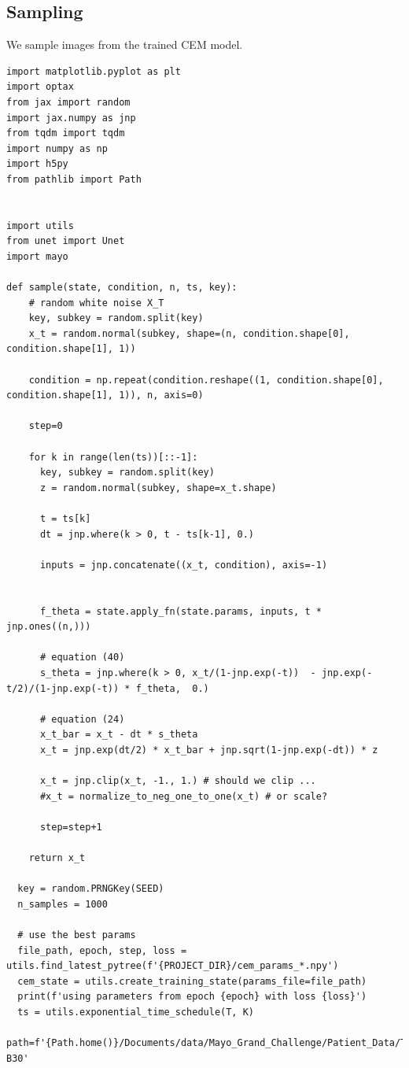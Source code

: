 \documentclass[a4paper, 11pt]{article}
\begin{document}
\subsection{Sampling}
\label{sec:org9203451}
We sample images from the trained CEM model.
\begin{verbatim}
import matplotlib.pyplot as plt
import optax
from jax import random
import jax.numpy as jnp
from tqdm import tqdm
import numpy as np
import h5py
from pathlib import Path


import utils
from unet import Unet
import mayo

def sample(state, condition, n, ts, key):
    # random white noise X_T
    key, subkey = random.split(key)
    x_t = random.normal(subkey, shape=(n, condition.shape[0], condition.shape[1], 1))

    condition = np.repeat(condition.reshape((1, condition.shape[0], condition.shape[1], 1)), n, axis=0)

    step=0

    for k in range(len(ts))[::-1]:
      key, subkey = random.split(key)
      z = random.normal(subkey, shape=x_t.shape)

      t = ts[k]
      dt = jnp.where(k > 0, t - ts[k-1], 0.)

      inputs = jnp.concatenate((x_t, condition), axis=-1)


      f_theta = state.apply_fn(state.params, inputs, t * jnp.ones((n,)))

      # equation (40)
      s_theta = jnp.where(k > 0, x_t/(1-jnp.exp(-t))  - jnp.exp(-t/2)/(1-jnp.exp(-t)) * f_theta,  0.)

      # equation (24)
      x_t_bar = x_t - dt * s_theta
      x_t = jnp.exp(dt/2) * x_t_bar + jnp.sqrt(1-jnp.exp(-dt)) * z

      x_t = jnp.clip(x_t, -1., 1.) # should we clip ...
      #x_t = normalize_to_neg_one_to_one(x_t) # or scale?

      step=step+1

    return x_t

  key = random.PRNGKey(SEED)
  n_samples = 1000

  # use the best params
  file_path, epoch, step, loss = utils.find_latest_pytree(f'{PROJECT_DIR}/cem_params_*.npy')
  cem_state = utils.create_training_state(params_file=file_path)
  print(f'using parameters from epoch {epoch} with loss {loss}')
  ts = utils.exponential_time_schedule(T, K)
  path=f'{Path.home()}/Documents/data/Mayo_Grand_Challenge/Patient_Data/Training_Image_Data/3mm B30'


\end{verbatim}
\end{document}
